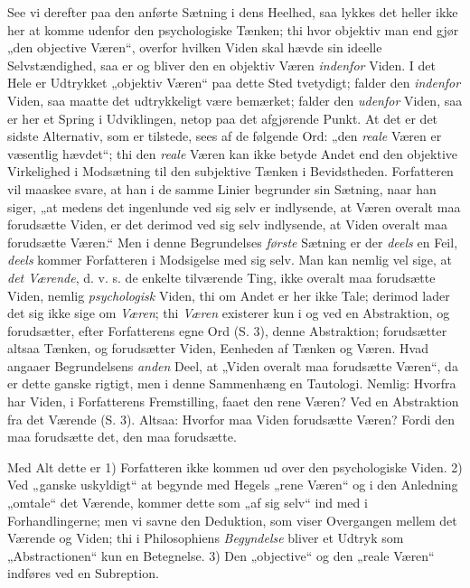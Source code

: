 \documentclass[12pt,a4paper]{book}
\newcommand{\opage}[1]{\marginnote{\footnotesize\textit{[#1]}}}
\begin{document}
See vi derefter paa den anførte Sætning i dens Heelhed,
saa lykkes det heller ikke her at komme udenfor den
psychologiske Tænken; thi hvor objektiv man end gjør „den
objective Væren“, overfor hvilken Viden skal hævde sin
\opage{63}\setcounter{footnote}{0}%
ideelle Selvstændighed, saa er og bliver den en objektiv
Væren \emph{indenfor} Viden. I det Hele er Udtrykket „objektiv
Væren“ paa dette Sted tvetydigt; falder den \emph{indenfor}
Viden, saa maatte det udtrykkeligt være bemærket;
falder den \emph{udenfor} Viden, saa er her et
Spring i Udviklingen, netop paa det afgjørende Punkt.
At det er det sidste Alternativ, som er tilstede, sees af
de følgende Ord: „den \emph{reale} Væren er væsentlig
hævdet“; thi den \emph{reale} Væren kan ikke betyde Andet
end den objektive Virkelighed i Modsætning til den subjektive
Tænken i Bevidstheden. Forfatteren vil maaskee
svare, at han i de samme Linier begrunder sin Sætning,
naar han siger, „at medens det ingenlunde ved sig selv
er indlysende, at Væren overalt maa forudsætte Viden,
er det derimod ved sig selv indlysende, at Viden overalt
maa forudsætte Væren.“ Men i denne Begrundelses
\emph{første} Sætning er der \emph{deels} en Feil, \emph{deels} kommer
Forfatteren i Modsigelse med sig selv. Man kan nemlig
vel sige, at \emph{det Værende}, d. v. s. de enkelte tilværende
Ting, ikke overalt maa forudsætte Viden, nemlig
\emph{psychologisk} Viden, thi om Andet er her ikke Tale; derimod
lader det sig ikke sige om \emph{Væren}; thi \emph{Væren} existerer
kun i og ved en Abstraktion, og forudsætter, efter Forfatterens
egne Ord (S. 3), denne Abstraktion; forudsætter
altsaa Tænken, og forudsætter Viden, Eenheden af
Tænken og Væren. Hvad angaaer Begrundelsens \emph{anden}
Deel, at „Viden overalt maa forudsætte Væren“, da er
dette ganske rigtigt, men i denne Sammenhæng en Tautologi.
Nemlig: Hvorfra har Viden, i Forfatterens Fremstilling,
faaet den rene Væren? Ved en Abstraktion fra det Væ\opage{64}\setcounter{footnote}{0}rende
(S. 3). Altsaa: Hvorfor maa Viden forudsætte
Væren? Fordi den maa forudsætte det, den maa forudsætte.

Med Alt dette er 1) Forfatteren ikke kommen ud
over den psychologiske Viden. 2) Ved „ganske uskyldigt“
at begynde med Hegels „rene Væren“ og i den Anledning
„omtale“ det Værende, kommer dette som „af sig
selv“ ind med i Forhandlingerne; men vi savne den Deduktion,
som viser Overgangen mellem det Værende og
Viden; thi i Philosophiens \emph{Begyndelse} bliver et Udtryk
som „Abstractionen“ kun en Betegnelse. 3) Den „objective“
og den „reale Væren“ indføres ved en Subreption.
\end{document}
